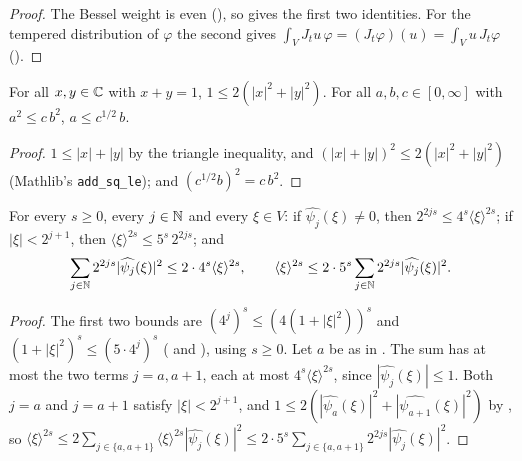 \begin{proof}
\leanok
The Bessel weight is even (), so 
gives the first two identities. For the tempered distribution of $\varphi$ the second gives
$\int_V J_t u \, \varphi = (J_t \varphi)(u) = \int_V u \, J_t \varphi$
().
\end{proof}

\begin{lemma}
\label{lem:elementary-square-inequalities}
\leanok
For all $x, y \in \mathbb{C}$ with $x + y = 1$, $1 \leq 2(|x|^2 + |y|^2)$. For all
$a, b, c \in [0, \infty]$ with $a^2 \leq c \, b^2$, $a \leq c^{1/2} \, b$.
\end{lemma}

\begin{proof}
\leanok
$1 \leq |x| + |y|$ by the triangle inequality, and $(|x| + |y|)^2 \leq 2(|x|^2 + |y|^2)$
(Mathlib's \texttt{add\_\allowbreak sq\_\allowbreak le}); and $(c^{1/2} b)^2 = c \, b^2$.
\end{proof}

\begin{proposition}
\label{prop:bessel-lp-weights}
\leanok
{}
For every $s \geq 0$, every $j \in \mathbb{N}$ and every $\xi \in V$: if $\widehat{\psi_j}(\xi) \neq 0$,
then $2^{2js} \leq 4^s \langle \xi \rangle^{2s}$; if $|\xi| < 2^{j+1}$, then
$\langle \xi \rangle^{2s} \leq 5^s \, 2^{2js}$; and
\[
  \sum_{j \in \mathbb{N}} 2^{2js} |\widehat{\psi_j}(\xi)|^2 \leq 2 \cdot 4^s \langle \xi \rangle^{2s},
  \qquad
  \langle \xi \rangle^{2s} \leq 2 \cdot 5^s \sum_{j \in \mathbb{N}} 2^{2js} |\widehat{\psi_j}(\xi)|^2 .
\]
\end{proposition}

\begin{proof}
\leanok
The first two bounds are $(4^j)^s \leq (4(1 + |\xi|^2))^s$ and
$(1 + |\xi|^2)^s \leq (5 \cdot 4^j)^s$ ( and
), using $s \geq 0$. Let $a$ be as in .
The sum has at most the two terms $j = a, a + 1$, each at most $4^s \langle \xi \rangle^{2s}$, since
$|\widehat{\psi_j}(\xi)| \leq 1$. Both $j = a$ and $j = a + 1$ satisfy $|\xi| < 2^{j+1}$, and
$1 \leq 2 (|\widehat{\psi_a}(\xi)|^2 + |\widehat{\psi_{a+1}}(\xi)|^2)$ by
, so
$\langle \xi \rangle^{2s} \leq 2 \sum_{j \in \{a, a+1\}} \langle \xi \rangle^{2s}
|\widehat{\psi_j}(\xi)|^2 \leq 2 \cdot 5^s \sum_{j \in \{a, a+1\}} 2^{2js}
|\widehat{\psi_j}(\xi)|^2$.
\end{proof}

